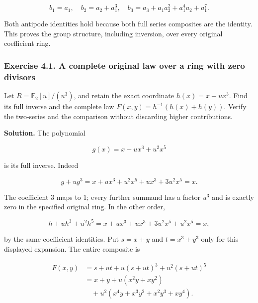 \begin{equation}
b_1=a_1,\quad b_2=a_2+a_1^3,\quad
 b_3=a_3+a_1a_2^2+a_1^4a_2+a_1^7.
 \label{courseIII:the-exact-characteristic-two-coordinate-calculation:eq:4.2}
\end{equation}

Both antipode identities hold because both full series composites are the identity. This proves the group structure, including inversion, over every original coefficient ring.

\subsubsection{Exercise 4.1. A complete original law over a ring with zero divisors}
\label{courseIII:the-exact-characteristic-two-coordinate-calculation:exercise-4.1}

\label{courseIII:formal-char2:4.1}

Let \(R=\mathbb F_2[u]/(u^3)\), and retain the exact coordinate \(h(x)=x+ux^3\). Find its full inverse and the complete law \(F(x,y)=h^{-1}(h(x)+h(y))\). Verify the two-series and the comparison without discarding higher contributions.

\textbf{Solution.} The polynomial

\begin{equation}
g(x)=x+ux^3+u^2x^5
 \label{courseIII:the-exact-characteristic-two-coordinate-calculation:eq:4.3}
\end{equation}

is its full inverse. Indeed

\[
g+ug^3=x+ux^3+u^2x^5+ux^3+3u^2x^5=x.
\]

The coefficient \(3\) maps to \(1\); every further summand has a factor \(u^3\) and is exactly zero in the specified original ring. In the other order,

\[
h+uh^3+u^2h^5=x+ux^3+ux^3+3u^2x^5+u^2x^5=x,
\]

by the same coefficient identities. Put \(s=x+y\) and \(t=x^3+y^3\) only for this displayed expansion. The entire composite is

\begin{equation}
\begin{aligned}
 F(x,y)&=s+ut+u(s+ut)^3+u^2(s+ut)^5\\
 &=x+y+u(x^2y+xy^2)\\
 &\quad+u^2(x^4y+x^3y^2+x^2y^3+xy^4).
\end{aligned}
 \label{courseIII:the-exact-characteristic-two-coordinate-calculation:eq:4.4}
\end{equation}


